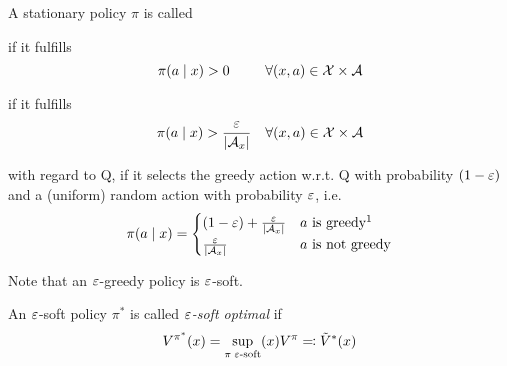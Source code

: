 \begin{definition}
	A stationary policy \(\pi\) is called 
	\begin{description}[font=\normalfont]
		\item[\emph{soft}] if it fulfills 
		\[
			\pi(a\mid x)>0 \qquad\;\; \forall (x,a)\in\mathcal{X}\times\mathcal{A}
		\]
		\item[\emph{\(\vep\)-soft}] if it fulfills 
		\[
			\pi(a\mid x)>\frac{\varepsilon}{|\mathcal{A}_x|} \quad \forall (x,a)\in\mathcal{X}\times\mathcal{A}
		\]
		\item[\emph{\(\vep\)-greedy}] with regard to Q, if it selects the greedy action w.r.t. Q with probability \((1-\varepsilon)\) and a (uniform) random action with probability \(\vep\), i.e. \[\pi(a\mid x)=
			\begin{cases}
				(1-\vep)+ \frac{\vep}{|\cA_x|} & a \text{ is greedy\footnotemark[1]}\\
				\frac{\vep}{|\cA_x|} & a \text{ is not greedy}
			\end{cases}
		\]
	\end{description}
	Note that an \(\vep\)-greedy policy is \(\vep\)-soft.

	An \(\vep\)-soft policy \(\pi^*\) is called \emph{\(\vep\)-soft optimal} if 
	\[
		V^{\pi^*}(x)=\sup_{\pi\; \varepsilon\text{-soft}}(x) V^\pi \eqqcolon \tilde{V}^*(x)
	\]
\end{definition}

